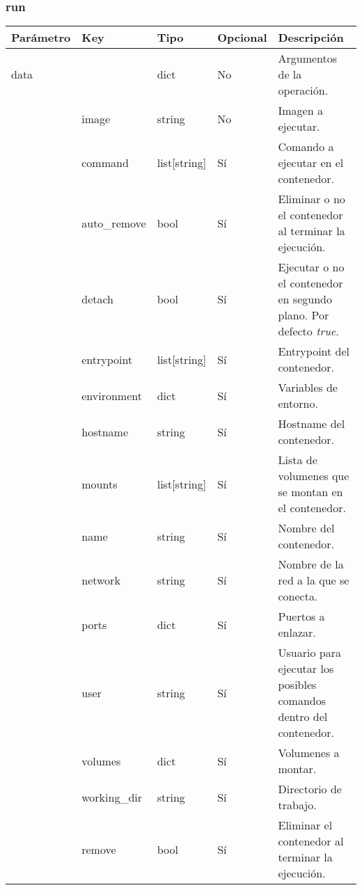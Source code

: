 		\subsubsection{run}
			\begin{table}[h!]
				\centering
	\begin{adjustbox}{max width=\textwidth}
				\begin{tabularx}{\linewidth}{|l|l|l|l|L|}
					\hline
					Parámetro & Key & Tipo & Opcional & Descripción \\ \hline
					data &  & dict & No & Argumentos de la operación. \\ \hline
					& image & string & No & Imagen a ejecutar. \\ \hline
					& command & list[string] & Sí & Comando a ejecutar en el contenedor. \\ \hline
					& auto\_remove & bool & Sí & Eliminar o no el contenedor al terminar la ejecución. \\ \hline
					& detach & bool & Sí & Ejecutar o no el contenedor en segundo plano. Por defecto \textit{true}. \\ \hline
					& entrypoint & list[string] & Sí & Entrypoint del contenedor. \\ \hline
					& environment & dict & Sí & Variables de entorno. \\ \hline
					& hostname & string & Sí & Hostname del contenedor. \\ \hline
					& mounts & list[string] & Sí & Lista de volumenes que se montan en el contenedor. \\ \hline
					& name & string & Sí & Nombre del contenedor. \\ \hline
					& network & string & Sí & Nombre de la red a la que se conecta. \\ \hline
					& ports & dict & Sí & Puertos a enlazar. \\ \hline
					& user & string & Sí & Usuario para ejecutar los posibles comandos dentro del contenedor. \\ \hline
					& volumes & dict & Sí & Volumenes a montar. \\ \hline
					& working\_dir & string & Sí & Directorio de trabajo. \\ \hline
					& remove & bool & Sí & Eliminar el contenedor al terminar la ejecución. \\ \hline
				\end{tabularx}
\end{adjustbox}
			\end{table}
		
